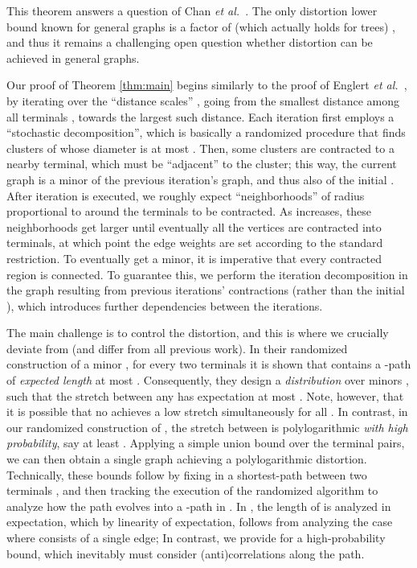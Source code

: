 \documentclass[twoside,leqno,twocolumn]{article}
\newcommand{\etal}{{\em et al.\ }\xspace}
\begin{document}
This theorem answers a question of Chan \etal \cite{CXKR06}. The only distortion lower bound known for general graphs 
is a factor of  (which actually holds for trees) \cite{CXKR06},
and thus it remains a challenging open question whether 
 distortion can be achieved in general graphs.

Our proof of Theorem \ref{thm:main} begins similarly to the proof of Englert \etal \cite{EGKRTT10}, 
by iterating over the ``distance scales'' , 
going from the smallest distance  among all terminals ,
towards the largest such distance.
Each iteration  first employs a ``stochastic decomposition'',
which is basically a randomized procedure that finds 
clusters of  whose diameter is at most .
Then, some clusters are contracted to a nearby terminal,
which must be ``adjacent'' to the cluster;
this way, the current graph is a minor of the previous iteration's graph, 
and thus also of the initial .
After iteration  is executed, 
we roughly expect ``neighborhoods'' of radius proportional to  
around the terminals to be contracted.
As  increases, these neighborhoods get larger
until eventually all the vertices are contracted into terminals,
at which point the edge weights are set according to the standard restriction.
To eventually get a minor, 
it is imperative that every contracted region is connected.
To guarantee this, we perform the iteration  decomposition in the graph 
resulting from previous iterations' contractions (rather than the initial ),
which introduces further dependencies between the iterations.

The main challenge is to control the distortion,
and this is where we crucially deviate from \cite{EGKRTT10}
(and differ from all previous work).
In their randomized construction of a minor , 
for every two terminals  it is shown that  contains
a -path of \emph{expected length} at most .
Consequently, they design a \emph{distribution}  over minors ,
such that the stretch  between any 
has expectation at most . Note, however, that it is possible that no  achieves a low stretch 
simultaneously for all .
In contrast, in our randomized construction of ,
the stretch between  is polylogarithmic
\emph{with high probability}, say at least .
Applying a simple union bound over the  terminal pairs,
we can then obtain a single graph  achieving a polylogarithmic distortion.
Technically, these bounds follow by fixing in  
a shortest-path  between two terminals ,
and then tracking the execution of the randomized algorithm
to analyze how the path  evolves into a -path  in .
In \cite{EGKRTT10}, the length of  is analyzed in expectation,
which by linearity of expectation, 
follows from analyzing the case where  consists of a single edge;
In contrast, we provide for  a high-probability bound,
which inevitably must consider (anti)correlations along the path.
\end{document}
